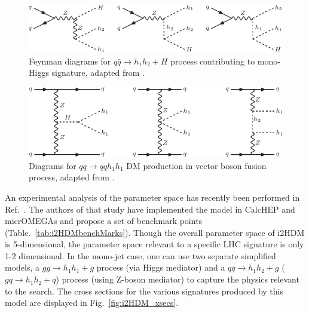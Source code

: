 \begin{figure}[htb]
\includegraphics[width=\textwidth]{figures/EW/i2HDM/fd-mono-h2.pdf} 
\caption{Feynman diagrams for $q\bar{q}\to h_1 h_2+H$  process 
contributing to mono-Higgs signature, adapted from \cite{Belyaev:2015tap}.}
\label{fig:fdmonoH2}
\end{figure}
\begin{figure}[htb]
\includegraphics[width=\textwidth]{figures/EW/i2HDM/fd-vbf.pdf} 
\caption{Diagrams for $qq\to qq h_1 h_1$ DM production in vector boson
fusion process, adapted from \cite{Belyaev:2015tap}.}
\label{fig:fdvbf}
\end{figure}

An experimental analysis of the parameter space has recently been
performed in Ref.~\cite{Belyaev:2015tap}. The authors of that study
have implemented the model in CalcHEP and micrOMEGAs and propose a set
of benchmark points (Table.~\ref{tab:i2HDMbenchMarks}). Though the
overall parameter space of i2HDM is 5-dimensional, the parameter space
relevant to a specific LHC signature is only 1-2 dimensional. In the
mono-jet case, one can use two separate simplified models, a
$gg\to h_1 h_1+g$ process (via Higgs mediator) and a
$q\bar{q}\to h_1 h_2+g$ ($gq\to h_1 h_2+q$) process (using Z-boson
mediator) to capture the physics relevant to the search. The cross sections for the 
various signatures produced by this model are displayed in Fig.~\ref{fig:i2HDM_xsecs}.

